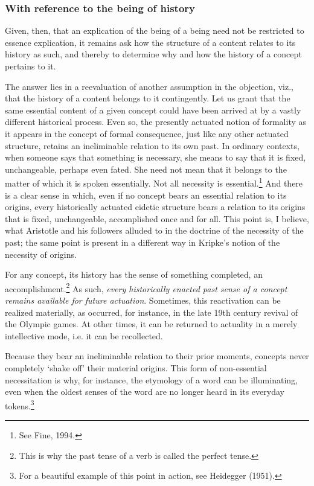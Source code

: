 \documentclass[]{article}
\begin{document}
\subsubsection{With reference to the being of history}
Given, then, that an explication of the being of a being need not be restricted to essence explication, it remains ask how the structure of a content relates to its history as such, and thereby to determine why and how the history of a concept pertains to it.

The answer lies in a reevaluation of another assumption in the objection, viz., that the history of a content belongs to it contingently. Let us grant that the same essential content of a given concept could have been arrived at by a vastly different historical process. Even so, the presently actuated notion of formality as it appears in the concept of formal consequence, just like any other actuated structure, retains an ineliminable relation to its own past. In ordinary contexts, when someone says that something is necessary, she means to say that it is fixed, unchangeable, perhaps even fated. She need not mean that it belongs to the matter of which it is spoken essentially. Not all necessity is essential.\footnote{See Fine, 1994.} And there is a clear sense in which, even if no concept bears an essential relation to its origins, every historically actuated eidetic structure bears a relation to its origins that is fixed, unchangeable, accomplished once and for all. This point is, I believe, what Aristotle and his followers alluded to in the doctrine of the necessity of the past; the same point is present in a different way in Kripke's notion of the necessity of origins.

For any concept, its history has the sense of something completed, an accomplishment.\footnote{This is why the past tense of a verb is called the perfect tense.} As such, \textit{every historically enacted past sense of a concept remains available for future actuation}. Sometimes, this reactivation can be realized materially, as occurred, for instance, in the late 19th century revival of the Olympic games. At other times, it can be returned to actuality in a merely intellective mode, i.e. it can be recollected. 

Because they bear an ineliminable relation to their prior moments, concepts never completely `shake off' their material origins. This form of non-essential necessitation is why, for instance, the etymology of a word can be illuminating, even when the oldest senses of the word are no longer heard in its everyday tokens.\footnote{For a beautiful example of this point in action, see Heidegger (1951).}
\end{document}

